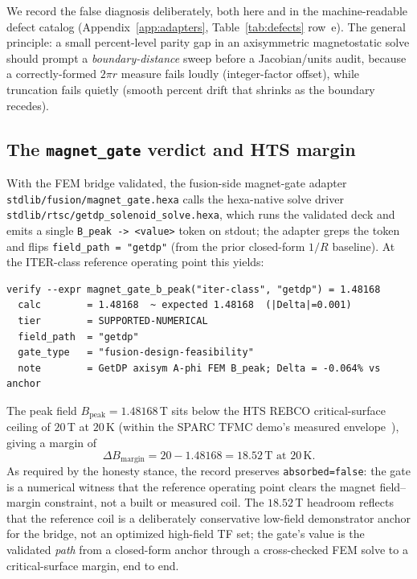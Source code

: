 We record the false diagnosis deliberately, both here and in the
machine-readable defect catalog (Appendix~\ref{app:adapters},
Table~\ref{tab:defects} row~e). The general principle: a small percent-level
parity gap in an axisymmetric magnetostatic solve should prompt a
\emph{boundary-distance} sweep before a Jacobian/units audit, because a
correctly-formed $2\pi r$ measure fails loudly (integer-factor offset), while
truncation fails quietly (smooth percent drift that shrinks as the boundary
recedes).

\subsection{The \texttt{magnet\_gate} verdict and HTS margin}
\label{app:magnet:gate}

With the FEM bridge validated, the fusion-side magnet-gate adapter
\texttt{stdlib/fusion/magnet\_gate.hexa} calls the hexa-native solve driver
\texttt{stdlib/rtsc/getdp\_solenoid\_solve.hexa}, which runs the validated
deck and emits a single \verb|B_peak -> <value>| token on stdout; the adapter
greps the token and flips \texttt{field\_path = "getdp"} (from the prior
closed-form $1/R$ baseline). At the ITER-class reference operating point this
yields:
\begin{lstlisting}
verify --expr magnet_gate_b_peak("iter-class", "getdp") = 1.48168
  calc        = 1.48168  ~ expected 1.48168  (|Delta|=0.001)
  tier        = SUPPORTED-NUMERICAL
  field_path  = "getdp"
  gate_type   = "fusion-design-feasibility"
  note        = GetDP axisym A-phi FEM B_peak; Delta = -0.064% vs anchor
\end{lstlisting}
The peak field $B_{\text{peak}} = 1.48168$\,T sits below the HTS REBCO
critical-surface ceiling of $20$\,T at $20$\,K (within the SPARC TFMC demo's
measured envelope~\citep{hartwig2024sparcmagnet}), giving a margin of
\begin{equation}
\Delta B_{\text{margin}} = 20 - 1.48168 = 18.52\,\text{T at }20\,\text{K}.
\end{equation}
As required by the honesty stance, the record preserves
\texttt{absorbed=false}: the gate is a numerical witness that the reference
operating point clears the magnet field--margin constraint, not a built or
measured coil. The $18.52$\,T headroom reflects that the reference coil is a
deliberately conservative low-field demonstrator anchor for the bridge, not an
optimized high-field TF set; the gate's value is the validated \emph{path}
from a closed-form anchor through a cross-checked FEM solve to a critical-surface
margin, end to end.
